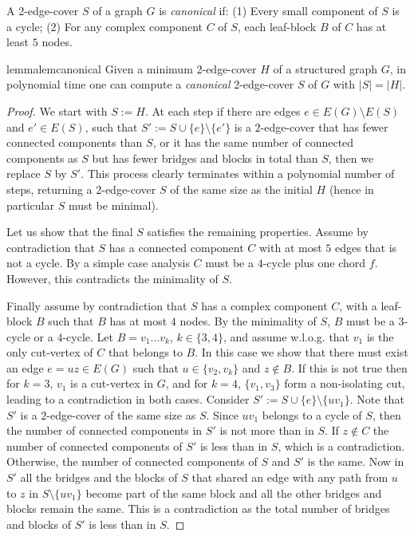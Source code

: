 \documentclass{article}
\begin{document}
\begin{definition}
A 2-edge-cover $S$ of a graph $G$ is \emph{canonical} if: (1) Every small component of $S$ is a cycle; (2) For any complex component $C$ of $S$, each leaf-block $B$ of $C$ has at least $5$ nodes.
\end{definition}
\begin{restatable}{lemma}{lemcanonical}\label{lem:canonical}
Given a minimum 2-edge-cover $H$ of a structured graph $G$, in  polynomial time one can compute a \emph{canonical} 2-edge-cover $S$ of $G$ with $|S|=|H|$. 
\end{restatable}
\begin{proof}
We start with $S:=H$. At each step if there are edges $e\in E(G)\setminus E(S)$ and  $e'\in E(S)$, such that $S':=S\cup \{e\}\setminus\{e'\}$ is a $2$-edge-cover that has fewer connected components than $S$, or it has the same number of connected components as $S$ but has fewer bridges and blocks in total than $S$, then we replace $S$ by $S'$. This process clearly terminates within a polynomial number of steps, returning a 2-edge-cover $S$ of the same size as the initial $H$ (hence in particular $S$ must be minimal).

Let us show that the final $S$ satisfies the remaining properties. Assume by contradiction that $S$ has a connected component $C$ with at most $5$ edges that is not a cycle. By a simple case analysis $C$ must be a $4$-cycle plus one chord $f$. However, this contradicts the minimality of $S$.

Finally assume by contradiction that $S$ has a complex component $C$, with a leaf-block $B$ such that $B$ has at most $4$ nodes. By the minimality of $S$, $B$ must be a $3$-cycle or a $4$-cycle. Let $B=v_1\ldots v_k$, $k\in \{3,4\}$, and assume w.l.o.g. that $v_1$ is the only cut-vertex of $C$ that belongs to $B$. In this case we show that there must exist an edge $e=uz\in E(G)$ such that $u\in \{v_2,v_k\}$ and $z\notin B$. If this is not true then for $k=3$, $v_1$ is a cut-vertex in $G$, and for $k=4$, $\{v_1,v_3\}$ form a non-isolating cut, leading to a contradiction in both cases.  Consider $S':=S\cup \{e\}\setminus\{uv_1\}$. Note that $S'$ is a $2$-edge-cover of the same size as $S$. Since $uv_1$ belongs to a cycle of $S$, then the number of connected components in $S'$ is not more than in $S$. If $z\notin C$ the number of connected components of $S'$ is less than in $S$, which is a contradiction. Otherwise, the number of connected components of $S$ and $S'$ is the same. Now in $S'$ all the bridges and the blocks of $S$ that shared an edge with any path from $u$ to $z$ in $S\setminus\{uv_1\}$ become part of the same block and all the other bridges and blocks remain the same. This is a contradiction as the total number of bridges and blocks of $S'$ is less than in $S$. 
\end{proof}
\end{document}
